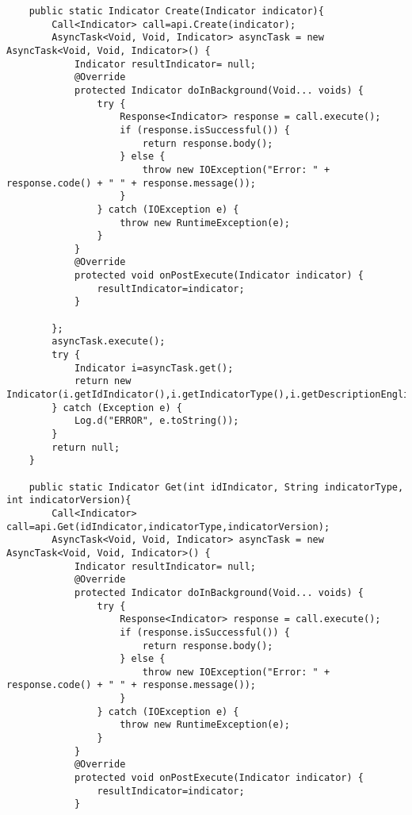 \begin{itemize}
\begin{itemize}
\begin{lstlisting}
    public static Indicator Create(Indicator indicator){
        Call<Indicator> call=api.Create(indicator);
        AsyncTask<Void, Void, Indicator> asyncTask = new AsyncTask<Void, Void, Indicator>() {
            Indicator resultIndicator= null;
            @Override
            protected Indicator doInBackground(Void... voids) {
                try {
                    Response<Indicator> response = call.execute();
                    if (response.isSuccessful()) {
                        return response.body();
                    } else {
                        throw new IOException("Error: " + response.code() + " " + response.message());
                    }
                } catch (IOException e) {
                    throw new RuntimeException(e);
                }
            }
            @Override
            protected void onPostExecute(Indicator indicator) {
                resultIndicator=indicator;
            }

        };
        asyncTask.execute();
        try {
            Indicator i=asyncTask.get();
            return new Indicator(i.getIdIndicator(),i.getIndicatorType(),i.getDescriptionEnglish(),i.getDescriptionSpanish(),i.getDescriptionFrench(),i.getPriority(),i.getIndicatorVersion());
        } catch (Exception e) {
            Log.d("ERROR", e.toString());
        }
        return null;
    }

    public static Indicator Get(int idIndicator, String indicatorType, int indicatorVersion){
        Call<Indicator> call=api.Get(idIndicator,indicatorType,indicatorVersion);
        AsyncTask<Void, Void, Indicator> asyncTask = new AsyncTask<Void, Void, Indicator>() {
            Indicator resultIndicator= null;
            @Override
            protected Indicator doInBackground(Void... voids) {
                try {
                    Response<Indicator> response = call.execute();
                    if (response.isSuccessful()) {
                        return response.body();
                    } else {
                        throw new IOException("Error: " + response.code() + " " + response.message());
                    }
                } catch (IOException e) {
                    throw new RuntimeException(e);
                }
            }
            @Override
            protected void onPostExecute(Indicator indicator) {
                resultIndicator=indicator;
            }


\end{lstlisting}
\end{itemize}
\end{itemize}
